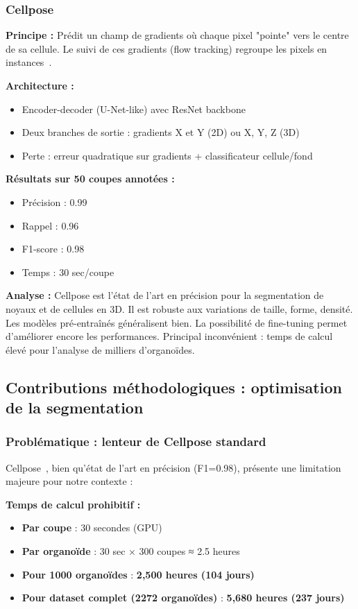 \subsubsection{Cellpose}

\textbf{Principe :}
Prédit un champ de gradients où chaque pixel "pointe" vers le centre de sa cellule. Le suivi de ces gradients (flow tracking) regroupe les pixels en instances~\cite{Stringer2021}.

\textbf{Architecture :}
\begin{itemize}
    \item Encoder-decoder (U-Net-like) avec ResNet backbone
    \item Deux branches de sortie : gradients X et Y (2D) ou X, Y, Z (3D)
    \item Perte : erreur quadratique sur gradients + classificateur cellule/fond
\end{itemize}

\textbf{Résultats sur 50 coupes annotées :}
\begin{itemize}
    \item Précision : 0.99
    \item Rappel : 0.96
    \item F1-score : 0.98
    \item Temps : 30 sec/coupe
\end{itemize}

\textbf{Analyse :}
Cellpose est l'état de l'art en précision pour la segmentation de noyaux et de cellules en 3D. Il est robuste aux variations de taille, forme, densité. Les modèles pré-entraînés généralisent bien. La possibilité de fine-tuning permet d'améliorer encore les performances. Principal inconvénient : temps de calcul élevé pour l'analyse de milliers d'organoïdes.

\subsection{Contributions méthodologiques : optimisation de la segmentation}

\subsubsection{Problématique : lenteur de Cellpose standard}

Cellpose~\cite{Stringer2021}, bien qu'état de l'art en précision (F1=0.98), présente une limitation majeure pour notre contexte :

\textbf{Temps de calcul prohibitif :}
\begin{itemize}
    \item \textbf{Par coupe} : 30 secondes (GPU)
    \item \textbf{Par organoïde} : 30 sec × 300 coupes ≈ 2.5 heures
    \item \textbf{Pour 1000 organoïdes} : \textbf{2,500 heures (104 jours)}
    \item \textbf{Pour dataset complet (2272 organoïdes)} : \textbf{5,680 heures (237 jours)}
\end{itemize}


